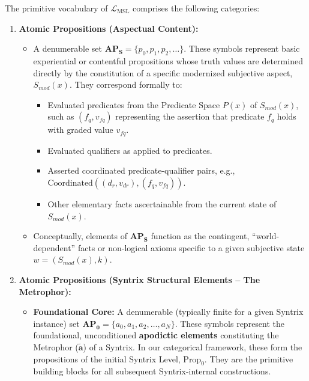 \documentclass[
    12pt,              %
    a4paper,           %
    headings=normal,   %
    twoside=true,      %
    BCOR=8mm,          %
]{scrbook}
\newcommand{\q}[1]{\enquote{#1}}
\newcommand{\metrophor}{\bm{\widetilde{a}}}
\newcommand{\Smodx}{S_{mod}(x)}
\newcommand{\LMSL}{\mathcal{L}_{\text{MSL}}}
\newcommand{\APS}{\mathbf{AP_S}}
\newcommand{\APZero}{\mathbf{AP_0}}
\newcommand{\Propk}[1]{\text{Prop}_{#1}}
\begin{document}
The primitive vocabulary of \(\LMSL\) comprises the following categories:

\begin{enumerate}[label=\arabic*.]
    \item  \textbf{Atomic Propositions (Aspectual Content):}
        \begin{itemize}
            \item   A denumerable set \(\APS = \{p_0, p_1, p_2, \ldots\}\). These symbols represent basic experiential or contentful propositions whose truth values are determined directly by the constitution of a specific modernized subjective aspect, \(\Smodx\). They correspond formally to:
                \begin{itemize}
                    \item   Evaluated predicates from the Predicate Space \(P(x)\) of \(\Smodx\), such as \((f_q, v_{fq})\) representing the assertion that predicate \(f_q\) holds with graded value \(v_{fq}\).
                    \item   Evaluated qualifiers as applied to predicates.
                    \item   Asserted coordinated predicate-qualifier pairs, e.g., \(\text{Coordinated}((d_r, v_{dr}), (f_q, v_{fq}))\).
                    \item   Other elementary facts ascertainable from the current state of \(\Smodx\).
                \end{itemize}
            \item   Conceptually, elements of \(\APS\) function as the contingent, \q{world-dependent} facts or non-logical axioms specific to a given subjective state \(w = (\Smodx, k)\).
        \end{itemize}

    \item  \textbf{Atomic Propositions (Syntrix Structural Elements – The Metrophor):}
        \begin{itemize}
            \item   \textbf{Foundational Core:} A denumerable (typically finite for a given Syntrix instance) set \(\APZero = \{a_0, a_1, a_2, \ldots, a_N\}\). These symbols represent the foundational, unconditioned \textbf{apodictic elements} constituting the Metrophor (\(\metrophor\)) of a Syntrix. In our categorical framework, these form the propositions of the initial Syntrix Level, \(\Propk{0}\). They are the primitive building blocks for all subsequent Syntrix-internal constructions.
        \end{itemize}


\end{enumerate}
\end{document}
